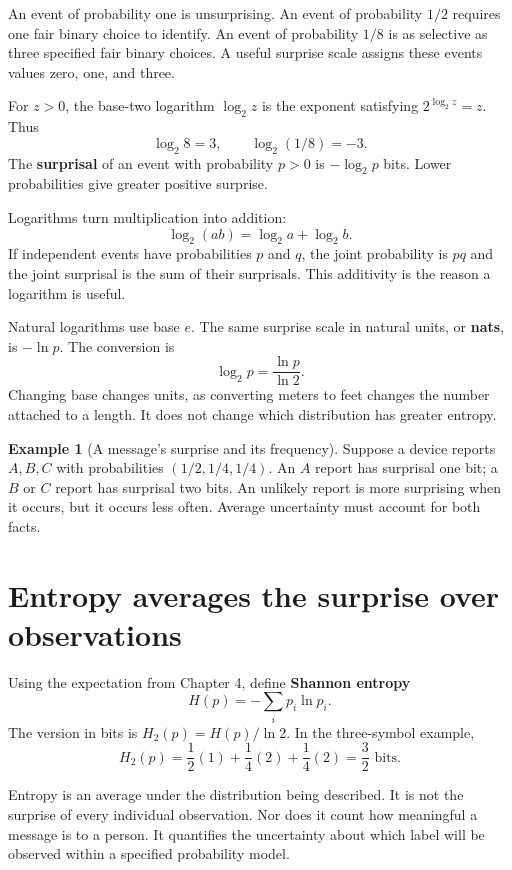 \documentclass[11pt,oneside,openany]{book}
\theoremstyle{definition}
\newtheorem{example}{Example}[chapter]
\theoremstyle{remark}
\numberwithin{equation}{chapter}
\begin{document}
An event of probability one is unsurprising. An event of probability \(1/2\) requires one fair binary choice to identify. An event of probability \(1/8\) is as selective as three specified fair binary choices. A useful surprise scale assigns these events values zero, one, and three.

For \(z>0\), the base-two logarithm \(\log_2 z\) is the exponent satisfying \(2^{\log_2z}=z\). Thus \[\log_2 8=3,\qquad \log_2(1/8)=-3.\] The \textbf{surprisal} of an event with probability \(p>0\) is \(-\log_2p\) bits. Lower probabilities give greater positive surprise.

Logarithms turn multiplication into addition: \[\log_2(ab)=\log_2a+\log_2b.\] If independent events have probabilities \(p\) and \(q\), the joint probability is \(pq\) and the joint surprisal is the sum of their surprisals. This additivity is the reason a logarithm is useful.

Natural logarithms use base \(e\). The same surprise scale in natural units, or \textbf{nats}, is \(-\ln p\). The conversion is \[\log_2p=\frac{\ln p}{\ln2}.\] Changing base changes units, as converting meters to feet changes the number attached to a length. It does not change which distribution has greater entropy.

\begin{example}[A message's surprise and its frequency]

Suppose a device reports \(A,B,C\) with probabilities \((1/2,1/4,1/4)\). An \(A\) report has surprisal one bit; a \(B\) or \(C\) report has surprisal two bits. An unlikely report is more surprising when it occurs, but it occurs less often. Average uncertainty must account for both facts.

\end{example}

\section{Entropy averages the surprise over observations}\label{ch05-entropy-averages-the-surprise-over-observations}

Using the expectation from Chapter 4, define \textbf{Shannon entropy} \[\boxed{H(p)=-\sum_i p_i\ln p_i.}\] The version in bits is \(H_2(p)=H(p)/\ln2\). In the three-symbol example, \[H_2(p)=\frac12(1)+\frac14(2)+\frac14(2)=\frac32\text{ bits}.\]

Entropy is an average under the distribution being described. It is not the surprise of every individual observation. Nor does it count how meaningful a message is to a person. It quantifies the uncertainty about which label will be observed within a specified probability model.
\end{document}
